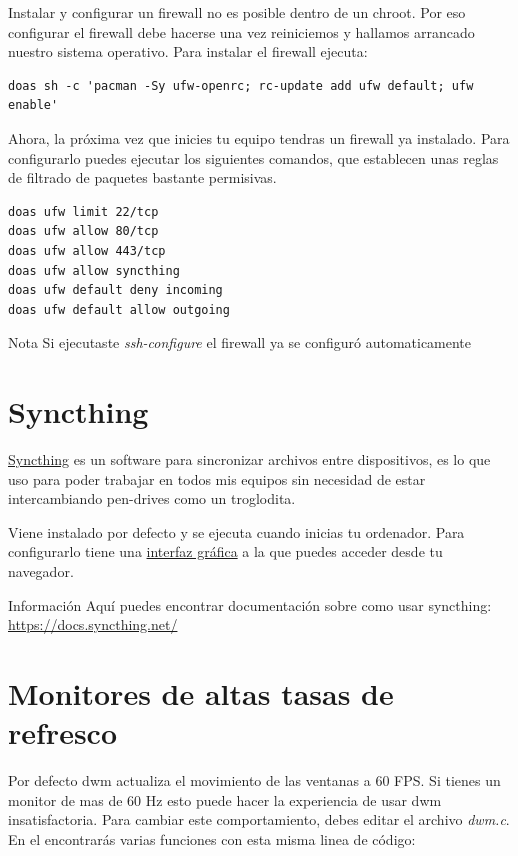 \documentclass[12pt]{article}
\begin{document}
Instalar y configurar un firewall no es posible dentro de un chroot. Por eso configurar el firewall debe hacerse una vez reiniciemos y hallamos arrancado nuestro sistema operativo. Para instalar el firewall ejecuta:

\begin{verbatim}
doas sh -c 'pacman -Sy ufw-openrc; rc-update add ufw default; ufw enable'
\end{verbatim}

Ahora, la próxima vez que inicies tu equipo tendras un firewall ya instalado. Para configurarlo puedes ejecutar los siguientes comandos, que establecen unas reglas de filtrado de paquetes bastante permisivas.

\begin{verbatim}
doas ufw limit 22/tcp
doas ufw allow 80/tcp
doas ufw allow 443/tcp
doas ufw allow syncthing
doas ufw default deny incoming
doas ufw default allow outgoing
\end{verbatim}

\begin{mybox}{Nota}
Si ejecutaste \emph{ssh-configure} el firewall ya se configuró automaticamente
\end{mybox}

\section{Syncthing}

\href{https://github.com/syncthing/syncthing}{Syncthing} es un software para sincronizar archivos entre dispositivos, es lo que uso para poder trabajar en todos mis equipos sin necesidad de estar intercambiando pen-drives como un troglodita.

Viene instalado por defecto y se ejecuta cuando inicias tu ordenador. Para configurarlo tiene una \href{http://localhost:8384/}{interfaz gráfica} a la que puedes acceder desde tu navegador.

\begin{mybox}{Información}
Aquí puedes encontrar documentación sobre como usar syncthing: \href{https://docs.syncthing.net/}{https://docs.syncthing.net/}
\end{mybox}

\section{Monitores de altas tasas de refresco}

Por defecto dwm actualiza el movimiento de las ventanas a 60 FPS. Si tienes un monitor de mas de 60 Hz esto puede hacer la experiencia de usar dwm insatisfactoria. Para cambiar este comportamiento, debes editar el archivo \emph{dwm.c}. En el encontrarás varias funciones con esta misma linea de código:
\end{document}
